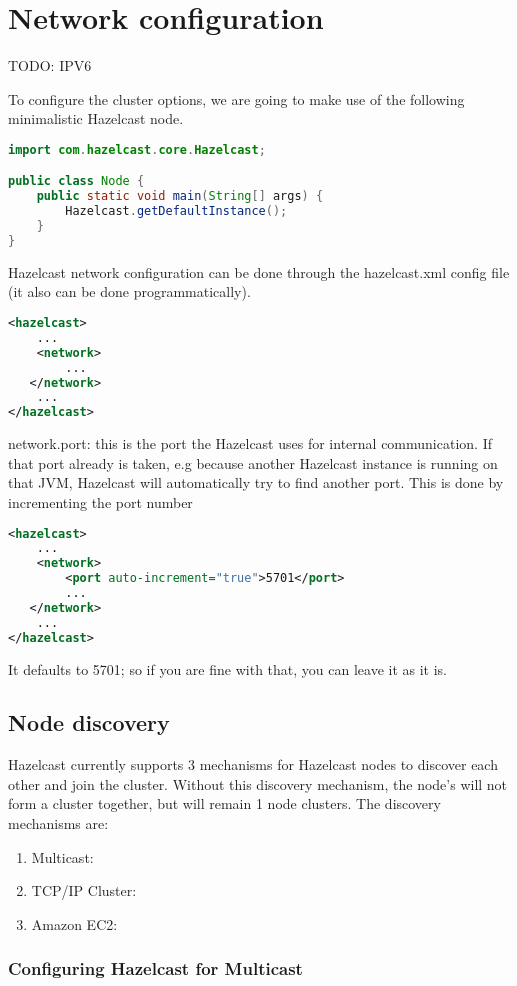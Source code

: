 \chapter{Network configuration}

TODO: IPV6

To configure the cluster options, we are going to make use of the following minimalistic Hazelcast node.
\begin{lstlisting}[language=java]
import com.hazelcast.core.Hazelcast;

public class Node {
    public static void main(String[] args) {
        Hazelcast.getDefaultInstance();
    }
}
\end{lstlisting}

Hazelcast network configuration can be done through the hazelcast.xml config file (it also can be done programmatically).
\begin{lstlisting}[language=xml]
<hazelcast>
    ...
    <network>
        ...  
   </network>
    ...
</hazelcast>
\end{lstlisting}


network.port:
this is the port the Hazelcast uses for internal communication. If that port already is taken, e.g because another Hazelcast instance is running on that JVM, Hazelcast will automatically try to find another port. This is done by incrementing the port number
\begin{lstlisting}[language=xml]
<hazelcast>
    ...
    <network>
        <port auto-increment="true">5701</port>
        ...  
   </network>
    ...
</hazelcast>
\end{lstlisting}
It defaults to 5701; so if you are fine with that, you can leave it as it is.

\section{Node discovery}
Hazelcast currently supports 3 mechanisms for Hazelcast nodes to discover each other and join the cluster. Without this discovery mechanism, the node's will not form a cluster together, but will remain 1 node clusters. The discovery mechanisms are:
\begin{enumerate}
\item Multicast:
\item TCP/IP Cluster:
\item Amazon EC2:
\end{enumerate}

\subsection{Configuring Hazelcast for Multicast}

